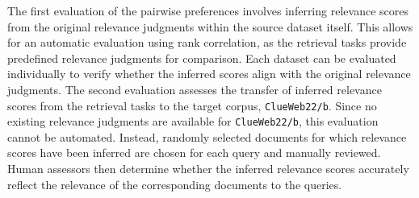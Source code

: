 The first evaluation of the pairwise preferences involves inferring relevance scores from the original relevance judgments within the source dataset itself. This allows for an automatic evaluation using rank correlation, as the retrieval tasks provide predefined relevance judgments for comparison. Each dataset can be evaluated individually to verify whether the inferred scores align with the original relevance judgments. The second evaluation assesses the transfer of inferred relevance scores from the retrieval tasks to the target corpus, \texttt{ClueWeb22/b}. Since no existing relevance judgments are available for \texttt{ClueWeb22/b}, this evaluation cannot be automated. Instead, randomly selected documents for which relevance scores have been inferred are chosen for each query and manually reviewed. Human assessors then determine whether the inferred relevance scores accurately reflect the relevance of the corresponding documents to the queries.

